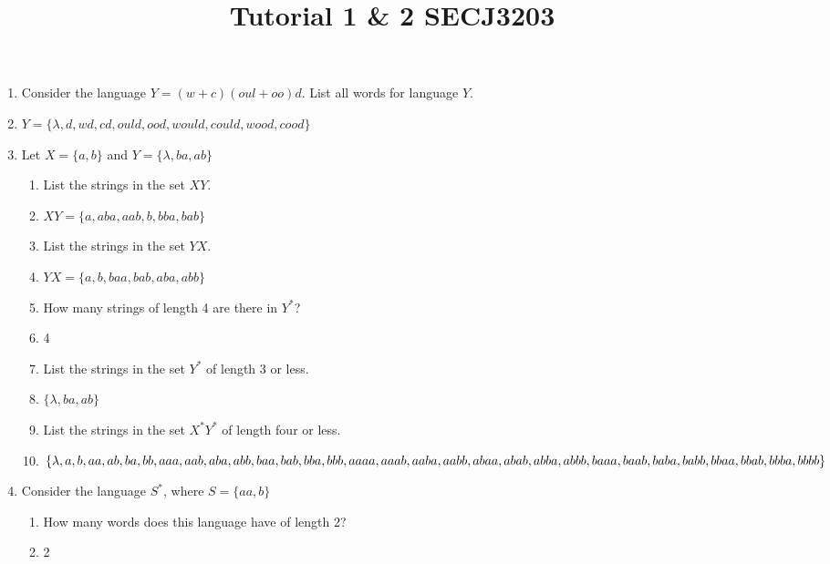 \documentclass[12pt]{article}
\title{Tutorial 1 \& 2 SECJ3203}
\date{}
\author{}
\makeatletter
\renewenvironment{proof}[1][\proofname]{\par
  \normalfont \topsep6\p@\@plus6\p@\relax
  \trivlist
  \item[\hskip\labelsep
        \itshape
    #1\@addpunct{.}]\ignorespaces
}{%
  \endtrivlist\@endpefalse
}
\renewcommand{\proofname}{Solution:}
\makeatother
\begin{document}
\begin{enumerate}
    \item Consider the language $Y=(w+c)(oul+oo)d$. List all words for language $Y$.
    \begin{proof}
        $Y=\{\lambda, d, wd, cd, ould, ood, would, could, wood, cood \}$
    \end{proof}
    
    \item Let $X=\{a, b\}$ and $Y=\{\lambda, ba, ab\}$
    \begin{enumerate}
        \item List the strings in the set $XY$.
        \begin{proof}
            $XY=\{a, aba, aab, b, bba, bab\}$
        \end{proof}
        
        \item List the strings in the set $YX$.
        \begin{proof}
            $YX=\{a, b, baa, bab, aba, abb\}$
        \end{proof}
        
        \item How many strings of length 4 are there in $Y^*$?
        \begin{proof}
            4
        \end{proof}
        
        \item List the strings in the set $Y^*$ of length 3 or less. 
        \begin{proof}
            $\{\lambda, ba, ab\}$
        \end{proof}
        
        \item List the strings in the set $X^*Y^*$ of length four or less.
        \begin{proof}
            $\{\lambda, a, b, aa, ab, ba, bb, aaa, aab, aba, abb, baa, bab, bba, bbb, aaaa, aaab, \\ aaba, aabb, abaa, abab, abba, abbb, baaa, baab, baba, babb, bbaa, bbab, bbba, bbbb\}$
        \end{proof}
    \end{enumerate}

    \item Consider the language $S^*$, where $S=\{aa, b\}$
    \begin{enumerate}
        \item How many words does this language have of length 2?
        \begin{proof}
            2
        \end{proof}


\end{enumerate}
\end{enumerate}
\end{document}

